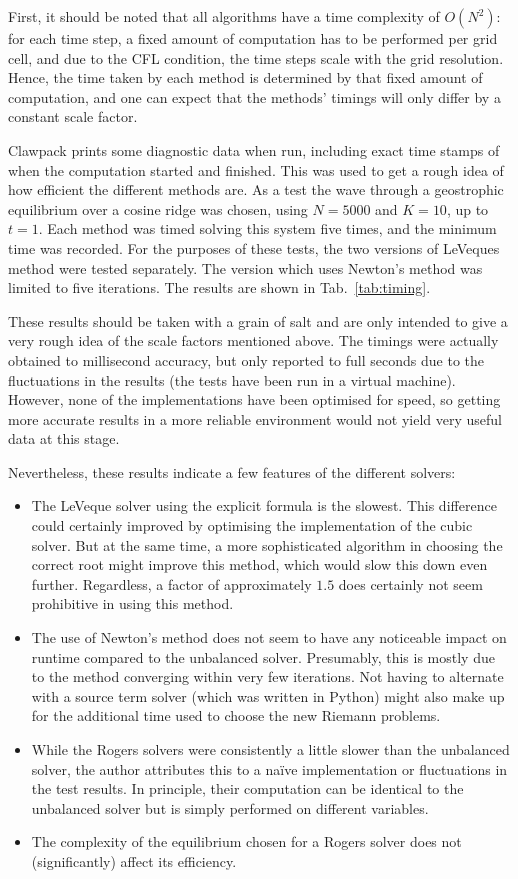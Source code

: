 First, it should be noted that all algorithms have a time complexity of $O(N^2)$: for each time step, a fixed amount of computation has to be performed per grid cell, and due to the CFL condition, the time steps scale with the grid resolution. Hence, the time taken by each method is determined by that fixed amount of computation, and one can expect that the methods' timings will only differ by a constant scale factor.

Clawpack prints some diagnostic data when run, including exact time stamps of when the computation started and finished. This was used to get a rough idea of how efficient the different methods are. As a test the wave through a geostrophic equilibrium over a cosine ridge was chosen, using $N = 5000$ and $K = 10$, up to $t = 1$. Each method was timed solving this system five times, and the minimum time was recorded. For the purposes of these tests, the two versions of LeVeques method were tested separately. The version which uses Newton's method was limited to five iterations. The results are shown in Tab.~\ref{tab:timing}.

These results should be taken with a grain of salt and are only intended to give a very rough idea of the scale factors mentioned above. The timings were actually obtained to millisecond accuracy, but only reported to full seconds due to the fluctuations in the results (the tests have been run in a virtual machine). However, none of the implementations have been optimised for speed, so getting more accurate results in a more reliable environment would not yield very useful data at this stage.

Nevertheless, these results indicate a few features of the different solvers:

\begin{itemize}
  \item The LeVeque solver using the explicit formula is the slowest. This difference could certainly improved by optimising the implementation of the cubic solver. But at the same time, a more sophisticated algorithm in choosing the correct root might improve this method, which would slow this down even further. Regardless, a factor of approximately $1.5$ does certainly not seem prohibitive in using this method.
  \item The use of Newton's method does not seem to have any noticeable impact on runtime compared to the unbalanced solver. Presumably, this is mostly due to the method converging within very few iterations. Not having to alternate with a source term solver (which was written in Python) might also make up for the additional time used to choose the new Riemann problems.
  \item While the Rogers solvers were consistently a little slower than the unbalanced solver, the author attributes this to a na\"ive implementation or fluctuations in the test results. In principle, their computation can be identical to the unbalanced solver but is simply performed on different variables.
  \item The complexity of the equilibrium chosen for a Rogers solver does not (significantly) affect its efficiency.
\end{itemize}